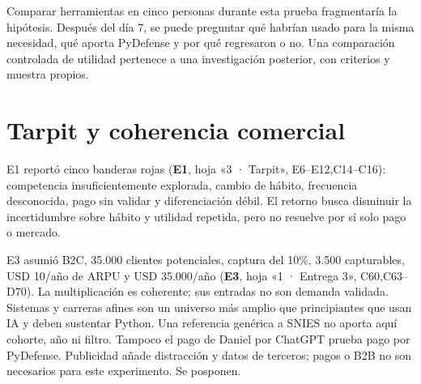 \documentclass[11pt,a4paper]{report}
\newcommand{\xl}[3]{\textbf{#1}, hoja «#2», #3}
\begin{document}
Comparar herramientas en cinco personas durante esta prueba fragmentaría la hipótesis. Después del día 7, se puede preguntar qué habrían usado para la misma necesidad, qué aporta PyDefense y por qué regresaron o no. Una comparación controlada de utilidad pertenece a una investigación posterior, con criterios y muestra propios.

\section{Tarpit y coherencia comercial}
E1 reportó cinco banderas rojas (\xl{E1}{3 · Tarpit}{E6--E12,C14--C16}): competencia insuficientemente explorada, cambio de hábito, frecuencia desconocida, pago sin validar y diferenciación débil. El retorno busca disminuir la incertidumbre sobre hábito y utilidad repetida, pero no resuelve por sí solo pago o mercado.

E3 asumió B2C, 35.000 clientes potenciales, captura del 10\%, 3.500 capturables, USD 10/año de ARPU y USD 35.000/año (\xl{E3}{1 · Entrega 3}{C60,C63--D70}). La multiplicación es coherente; sus entradas no son demanda validada. Sistemas y carreras afines son un universo más amplio que principiantes que usan IA y deben sustentar Python. Una referencia genérica a SNIES no aporta aquí cohorte, año ni filtro. Tampoco el pago de Daniel por ChatGPT prueba pago por PyDefense. Publicidad añade distracción y datos de terceros; pagos o B2B no son necesarios para este experimento. Se posponen.
\end{document}
